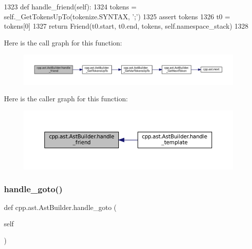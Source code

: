 \begin{DoxyCode}
1323     \textcolor{keyword}{def }handle\_friend(self):
1324         tokens = self.\_GetTokensUpTo(tokenize.SYNTAX, \textcolor{stringliteral}{';'})
1325         \textcolor{keyword}{assert} tokens
1326         t0 = tokens[0]
1327         \textcolor{keywordflow}{return} Friend(t0.start, t0.end, tokens, self.namespace\_stack)
1328 
\end{DoxyCode}
Here is the call graph for this function\+:
\nopagebreak
\begin{figure}[H]
\begin{center}
\leavevmode
\includegraphics[width=350pt]{classcpp_1_1ast_1_1AstBuilder_ab9f7d81019317c6ccfd492bd2c0c9579_cgraph}
\end{center}
\end{figure}
Here is the caller graph for this function\+:
\nopagebreak
\begin{figure}[H]
\begin{center}
\leavevmode
\includegraphics[width=350pt]{classcpp_1_1ast_1_1AstBuilder_ab9f7d81019317c6ccfd492bd2c0c9579_icgraph}
\end{center}
\end{figure}
\mbox{\label{classcpp_1_1ast_1_1AstBuilder_a8504d788bb1541ee581918d52d1f4132}} 
\subsubsection{\texorpdfstring{handle\+\_\+goto()}{handle\_goto()}}
{\footnotesize\ttfamily def cpp.\+ast.\+Ast\+Builder.\+handle\+\_\+goto (\begin{DoxyParamCaption}\item[{}]{self }\end{DoxyParamCaption})}



